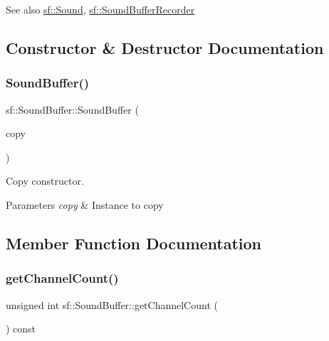 \begin{DoxySeeAlso}{See also}
\hyperlink{classsf_1_1_sound}{sf\+::\+Sound}, \hyperlink{classsf_1_1_sound_buffer_recorder}{sf\+::\+Sound\+Buffer\+Recorder} 
\end{DoxySeeAlso}


\subsection{Constructor \& Destructor Documentation}
\mbox{\label{classsf_1_1_sound_buffer_aaf000fc741ff27015907e8588263f4a6}} 
\subsubsection{\texorpdfstring{Sound\+Buffer()}{SoundBuffer()}}
{\footnotesize\ttfamily sf\+::\+Sound\+Buffer\+::\+Sound\+Buffer (\begin{DoxyParamCaption}\item[{const \hyperlink{classsf_1_1_sound_buffer}{Sound\+Buffer} \&}]{copy }\end{DoxyParamCaption})}



Copy constructor. 


\begin{DoxyParams}{Parameters}
{\em copy} & Instance to copy \\
\hline
\end{DoxyParams}


\subsection{Member Function Documentation}
\mbox{\label{classsf_1_1_sound_buffer_a127707b831d875ed790eef1aa2b9fcc3}} 
\subsubsection{\texorpdfstring{get\+Channel\+Count()}{getChannelCount()}}
{\footnotesize\ttfamily unsigned int sf\+::\+Sound\+Buffer\+::get\+Channel\+Count (\begin{DoxyParamCaption}{ }\end{DoxyParamCaption}) const}



